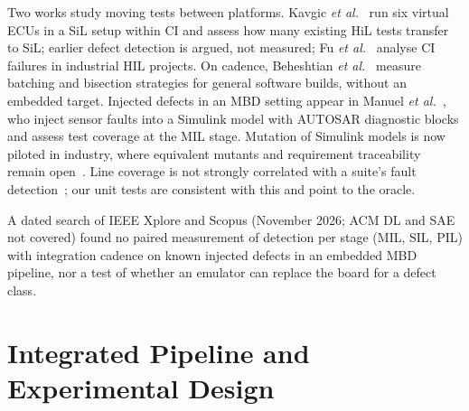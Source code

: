 \documentclass[conference]{IEEEtran}
\begin{document}
Two works study moving tests between platforms. Kavgic \emph{et al.}~\cite{kavgic2026} run six virtual ECUs
in a SiL setup within CI and assess how many existing HiL tests transfer to SiL; earlier defect detection
is argued, not measured; Fu \emph{et al.}~\cite{fu2022} analyse CI failures in industrial HIL projects. On
cadence, Beheshtian \emph{et al.}~\cite{beheshtian2022} measure batching
and bisection strategies for general software builds, without an embedded target. Injected defects in an MBD setting appear in Manuel \emph{et al.}~\cite{manuel2025}, who
inject sensor faults into a Simulink model with AUTOSAR diagnostic blocks and assess test coverage at the
MIL stage. Mutation of Simulink models is now piloted in industry, where equivalent mutants and requirement
traceability remain open~\cite{kavak2026}. Line coverage is not strongly correlated with a suite's fault
detection~\cite{inozemtseva2014}; our unit tests are consistent with this and point to the oracle.

A dated search of IEEE Xplore and Scopus (November 2026; ACM DL and SAE not covered) found no paired
measurement of detection per stage (MIL, SIL, PIL) with integration cadence on known injected defects in an
embedded MBD pipeline, nor a test of whether an emulator can replace the board for a defect class.

\section{Integrated Pipeline and Experimental Design}
\end{document}
